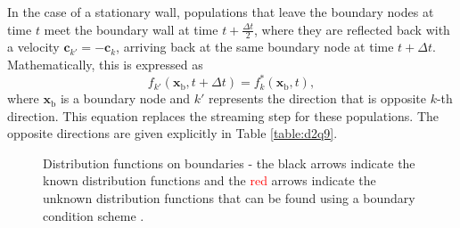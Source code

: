 \documentclass[a4paper, 11pt]{report}
\begin{document}
In the case of a stationary wall, populations that leave the boundary nodes at time $t$ meet the boundary wall at time $t+\frac{\Delta t}{2}$, where they are reflected back with a velocity $\mathbf{c}_{k'} = -\mathbf{c}_k$, arriving back at the same boundary node at time $t+\Delta t$. Mathematically, this is expressed as
\begin{equation}
    f_{k'}(\mathbf{x}_\mathrm{b}, t+\Delta t) = f_k^*(\mathbf{x}_\mathrm{b},t), \label{eq:3.47}
\end{equation}
where $\mathbf{x}_\mathrm{b}$ is a boundary node and $k'$ represents the direction that is opposite $k$-th direction. This equation replaces the streaming step for these populations. The opposite directions are given explicitly in Table \ref{table:d2q9}. 

\begin{figure}[!htb]
    \centering
    
    \caption[Distribution functions on boundaries]{Distribution functions on boundaries - the black arrows indicate the known distribution functions and the \textcolor{red}{red} arrows indicate the unknown distribution functions that can be found using a boundary condition scheme \cite[Figure 3.6]{mp}.}
    \label{fig:nebb}
\end{figure}
\end{document}
